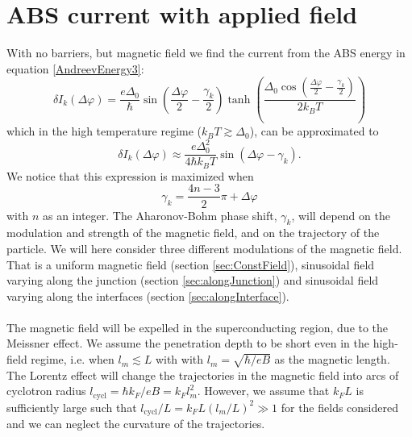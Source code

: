 \section{ABS current with applied field}
\label{sec:CurrentWithB}
With no barriers, but magnetic field we find the current from the ABS energy in equation \eqref{AndreevEnergy3}:
\begin{equation}
    \delta I_k(\Delta \varphi) = \frac{e\Delta_0}{\hbar} \sin\left(\frac{\Delta \varphi}{2} - \frac{\gamma_k}{2}\right)\tanh\left(\frac{\Delta_0\cos\left(\frac{\Delta \varphi}{2} - \frac{\gamma_k}{2}\right)}{2k_BT}\right)
\label{dIwithB}
\end{equation}
which in the high temperature regime ($k_BT \gtrsim \Delta_0$), can be approximated to
\begin{equation}
    \delta I_k(\Delta \varphi) \approx \frac{e\Delta_0^2}{4\hbar k_BT} \sin\left(\Delta \varphi -\gamma_k\right).
\label{dIwithBHighT}
\end{equation}
We notice that this expression is maximized when
\begin{equation}
    \gamma_k = \frac{4n-3}{2}\pi+\Delta\varphi
\label{Maximize}
\end{equation}
with $n$ as an integer. The Aharonov-Bohm phase shift, $\gamma_k$, will depend on the modulation and strength of the magnetic field, and on the trajectory of the particle. We will here consider three different modulations of the magnetic field. That is a uniform magnetic field (section \ref{sec:ConstField}), sinusoidal field varying along the junction (section \ref{sec:alongJunction}) and sinusoidal field varying along the interfaces (section \ref{sec:alongInterface}). 
\\
\\
The magnetic field will be expelled in the superconducting region, due to the Meissner effect. We assume the penetration depth to be short even in the high-field regime, i.e. when $l_m \lesssim L$ with with $l_m = \sqrt{\hbar/eB}$ as the magnetic length. The Lorentz effect will change the trajectories in the magnetic field into arcs of cyclotron radius $l_{\mathrm{cycl}} = \hbar k_F / eB = k_F l_m^2$. However, we assume that $k_F L$ is sufficiently large such that $l_{\mathrm{cycl}}/L = k_FL(l_m/L)^2 \gg 1$ for the fields considered and we can neglect the curvature of the trajectories. 

